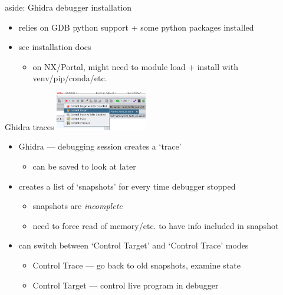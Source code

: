 \begin{frame}{aside: Ghidra debugger installation}
    \begin{itemize}
    \item relies on GDB python support + some python packages installed
    \item see installation docs
        \begin{itemize}
        \item on NX/Portal, might need to module load + install with venv/pip/conda/etc.
        \end{itemize}
    \end{itemize}
\end{frame}

\begin{frame}{Ghidra traces}
\includegraphics[width=0.3\textwidth]{../re-tools/ghidra-control-target.png}
    \begin{itemize}
    \item Ghidra --- debugging session creates a `trace'
        \begin{itemize}
        \item can be saved to look at later
        \end{itemize}
    \item creates a list of `snapshots' for every time debugger stopped
        \begin{itemize}
        \item snapshots are \textit{incomplete}
        \item need to force read of memory/etc. to have info included in snapshot
        \end{itemize}
    \item can switch between `Control Target' and `Control Trace' modes
        \begin{itemize}
        \item Control Trace --- go back to old snapshots, examine state
        \item Control Target --- control live program in debugger
        \end{itemize}
    \end{itemize}
\end{frame}


